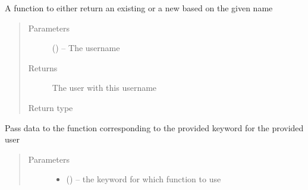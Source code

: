 \documentclass[letterpaper,10pt,english]{sphinxmanual}
\begin{document}
\begin{fulllineitems}
\begin{fulllineitems}
\begin{quote}
\begin{description}
\begin{itemize}
\end{itemize}

\end{description}\end{quote}

\end{fulllineitems}


\begin{fulllineitems}
\label{\detokenize{consumer:consumer.Consumer.authenticate}}
A function to either return an existing {\hyperref[\detokenize{user:user.User}]{}} or a new {\hyperref[\detokenize{user:user.User}]{}} based on the given name
\begin{quote}\begin{description}
\item[{Parameters}] \leavevmode
{} (\href{https://docs.python.org/2/library/functions.html\#str}{}) -- The username

\item[{Returns}] \leavevmode
The user with this username

\item[{Return type}] \leavevmode
{\hyperref[\detokenize{user:user.User}]{}}

\end{description}\end{quote}

\end{fulllineitems}


\begin{fulllineitems}
\label{\detokenize{consumer:consumer.Consumer.consumer}}
Pass data to the function corresponding to the provided keyword for the provided user
\begin{quote}\begin{description}
\item[{Parameters}] \leavevmode\begin{itemize}
\item {} 
 (\href{https://docs.python.org/2/library/functions.html\#str}{}) -- the keyword for which function to use


\end{itemize}
\end{description}
\end{quote}
\end{fulllineitems}
\end{fulllineitems}
\end{document}
